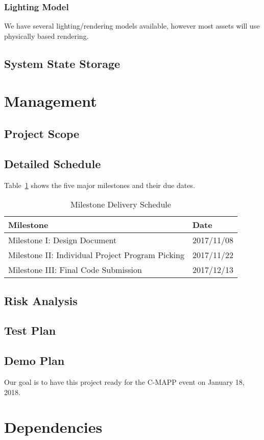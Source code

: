 \documentclass[titlepage,12pt]{article}
\begin{document}
\subsubsection{Lighting Model} We have several lighting/rendering models
available, however most assets will use physically based rendering.

\subsection{System State Storage}\label{sec:state}

\section{Management}

\subsection{Project Scope}

\subsection{Detailed Schedule}
Table~\ref{tab:milestones} shows the five major milestones and their due dates.
\begin{table}[H]
    \caption{Milestone Delivery Schedule}
    \label{tab:milestones}
    \centering
    \begin{tabular}{|l|l|}
        \hline
        \textbf{Milestone} & \textbf{Date} \\
        \hline\hline
        Milestone I: Design Document & 2017/11/08 \\
        \hline
        Milestone II: Individual Project Program Picking & 2017/11/22 \\
        \hline
        Milestone III: Final Code Submission & 2017/12/13 \\
        \hline
    \end{tabular}
\end{table}

\subsection{Risk Analysis}

\subsection{Test Plan}

\subsection{Demo Plan}
Our goal is to have this project ready for the C-MAPP event on January 18, 2018.

\section{Dependencies}
\end{document}
